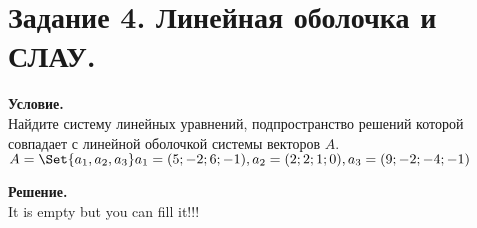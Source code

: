 \section{Задание 4. Линейная оболочка и СЛАУ.}

\textbf{Условие.}\\
Найдите систему линейных уравнений, подпространство решений которой совпадает с линейной
оболочкой системы векторов $A$.\\
$A = \Set{a_1, a_2, a_3}\\
a_1 = (5; -2; 6; -1),\\
a_2 = (2; 2; 1; 0),\\
a_3 = (9; -2; -4; -1)$

\vspace{10mm}
\noindent\textbf{Решение.}\\
It is empty but you can fill it!!!

\clearpage
